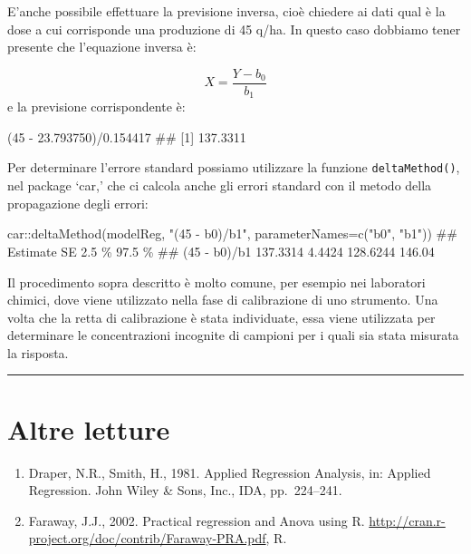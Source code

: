 \documentclass[a4paper,12pt,oneside]{book}
\providecommand{\tightlist}{%
  \setlength{\itemsep}{0pt}\setlength{\parskip}{0pt}}
\newenvironment{Shaded}{\begin{snugshade}}{\end{snugshade}}
\newcommand{\DecValTok}[1]{#1}
\newcommand{\FloatTok}[1]{#1}
\newcommand{\SpecialCharTok}[1]{#1}
\newcommand{\StringTok}[1]{#1}
\newcommand{\DocumentationTok}[1]{#1}
\newcommand{\FunctionTok}[1]{#1}
\newcommand{\AttributeTok}[1]{#1}
\newcommand{\NormalTok}[1]{#1}
\begin{document}
E'anche possibile effettuare la previsione inversa, cioè chiedere ai dati qual è la dose a cui corrisponde una produzione di 45 q/ha. In questo caso dobbiamo tener presente che l'equazione inversa è:

\[X = \frac{Y - b_0}{b_1}\]
e la previsione corrispondente è:

\begin{Shaded}
\begin{Highlighting}[]
\NormalTok{(}\DecValTok{45} \SpecialCharTok{{-}} \FloatTok{23.793750}\NormalTok{)}\SpecialCharTok{/}\FloatTok{0.154417}
\DocumentationTok{\#\# [1] 137.3311}
\end{Highlighting}
\end{Shaded}

Per determinare l'errore standard possiamo utilizzare la funzione \texttt{deltaMethod()}, nel package `car,' che ci calcola anche gli errori standard con il metodo della propagazione degli errori:

\begin{Shaded}
\begin{Highlighting}[]
\NormalTok{car}\SpecialCharTok{::}\FunctionTok{deltaMethod}\NormalTok{(modelReg, }\StringTok{"(45 {-} b0)/b1"}\NormalTok{, }
                 \AttributeTok{parameterNames=}\FunctionTok{c}\NormalTok{(}\StringTok{"b0"}\NormalTok{, }\StringTok{"b1"}\NormalTok{))}
\DocumentationTok{\#\#              Estimate       SE    2.5 \% 97.5 \%}
\DocumentationTok{\#\# (45 {-} b0)/b1 137.3314   4.4424 128.6244 146.04}
\end{Highlighting}
\end{Shaded}

Il procedimento sopra descritto è molto comune, per esempio nei laboratori chimici, dove viene utilizzato nella fase di calibrazione di uno strumento. Una volta che la retta di calibrazione è stata individuate, essa viene utilizzata per determinare le concentrazioni incognite di campioni per i quali sia stata misurata la risposta.

\begin{center}\rule{0.5\linewidth}{0.5pt}\end{center}

\hypertarget{altre-letture-9}{%
\section{Altre letture}\label{altre-letture-9}}

\begin{enumerate}
\def\labelenumi{\arabic{enumi}.}
\tightlist
\item
  Draper, N.R., Smith, H., 1981. Applied Regression Analysis, in: Applied Regression. John Wiley \& Sons, Inc., IDA, pp.~224--241.
\item
  Faraway, J.J., 2002. Practical regression and Anova using R. \url{http://cran.r-project.org/doc/contrib/Faraway-PRA.pdf}, R.
\end{enumerate}
\end{document}
